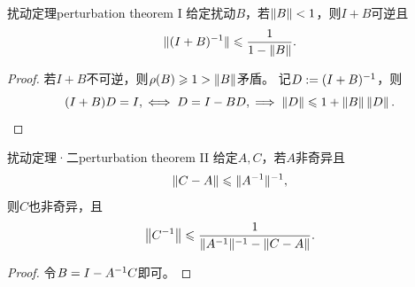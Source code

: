 \begin{theorem}
    {扰动定理}{perturbation theorem I}
    给定扰动$B$，若$\left\lVert B\right\rVert<1$，则$I+B$可逆且
    \begin{equation}
        \lVert(I+B)^{-1}\rVert\leqslant\frac1{1-\left\lVert B\right\rVert}.
    \end{equation}
\end{theorem}

\begin{proof}
    若$I+B$不可逆，则$\rho(B)\geqslant 1>\left\lVert B\right\rVert$矛盾。
    记$D:=(I+B)^{-1}$，则 
    \[
        (I+B)D=I,\iff D=I-BD,\implies \left\lVert D\right\rVert\leqslant 1+\left\lVert B\right\rVert\left\lVert D\right\rVert.
        \qedhere
    \]
\end{proof}

\begin{theorem}
    {扰动定理·二}{perturbation theorem II}
    给定$A,C$，若$A$非奇异且
    \[
        \left\lVert C-A\right\rVert\leqslant\lVert A^{-1}\rVert^{-1},
    \]
    则$C$也非奇异，且
    \begin{equation}
        \left\lVert C^{-1}\right\rVert\leqslant\frac{1}{\lVert A^{-1}\rVert^{-1}-\left\lVert C-A\right\rVert}.
    \end{equation}
\end{theorem}

\begin{proof}
    令$B=I-A^{-1} C$即可。
\end{proof}



